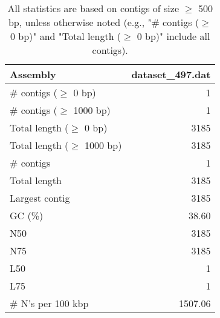 \documentclass[12pt,a4paper]{article}
\begin{document}
\begin{table}[ht]
\begin{center}
\caption{All statistics are based on contigs of size $\geq$ 500 bp, unless otherwise noted (e.g., "\# contigs ($\geq$ 0 bp)" and "Total length ($\geq$ 0 bp)" include all contigs).}
\begin{tabular}{|l*{1}{|r}|}
\hline
Assembly & dataset\_497.dat \\ \hline
\# contigs ($\geq$ 0 bp) & 1 \\ \hline
\# contigs ($\geq$ 1000 bp) & 1 \\ \hline
Total length ($\geq$ 0 bp) & 3185 \\ \hline
Total length ($\geq$ 1000 bp) & 3185 \\ \hline
\# contigs & 1 \\ \hline
Total length & 3185 \\ \hline
Largest contig & 3185 \\ \hline
GC (\%) & 38.60 \\ \hline
N50 & 3185 \\ \hline
N75 & 3185 \\ \hline
L50 & 1 \\ \hline
L75 & 1 \\ \hline
\# N's per 100 kbp & 1507.06 \\ \hline
\end{tabular}
\end{center}
\end{table}
\end{document}
